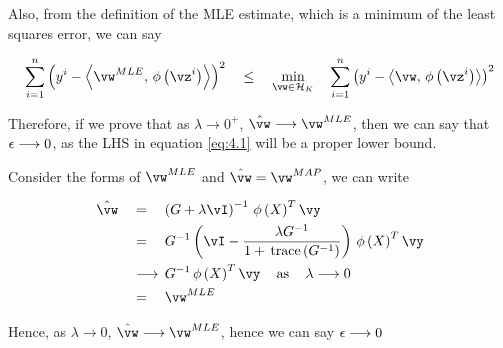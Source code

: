 \documentclass{article}
\begin{document}
\begin{mlsolution}
\begin{addmargin}{1.5em}
		 \br%

		Also, from the definition of the MLE estimate, which is a minimum of the least squares error, we can say

		\begin{align*}
			\sum_{i = 1}^n \para{y^i - \ip{\vw^{MLE}}{\func{\phi}{\vz^i}}}^2	\qle	\min_{\vw \in \Hlb} \quad \sum_{i = 1}^n \para{y^i - \ip{\vw}{\func{\phi}{\vz^i}}}^2
		\end{align*} \br%

		Therefore, if we prove that as $\lambda \longrightarrow 0^+$, $\hat{\vw} \longrightarrow \vw^{MLE}$, then we can say that $\epsilon \longrightarrow 0$, as the LHS in equation \ref{eq:4.1} will be a proper lower bound. \br%


		Consider the forms of $\vw^{MLE}$ and $\hat{\vw} = \vw^{MAP}$, we can write

		\begin{align*}
			\hat{\vw}	&\eq	\para{G + \lambda \iden}^{-1} \func{\phi}{X}^T \vy \\
						&\eq	G^{-1} \para{\iden - \frac{\lambda G^{-1}}{1 + \func{\trace}{G^{-1}}}} \func{\phi}{X}^T \vy \\
						&\quad\longrightarrow\,	G^{-1} \func{\phi}{X}^T \vy \quad \mt{as} \quad \lambda \longrightarrow 0 \\
						&\eq	\vw^{MLE}
		\end{align*}

		Hence, as $\lambda \longrightarrow 0$, $\hat{\vw} \longrightarrow \vw^{MLE}$, hence we can say $\epsilon \longrightarrow 0$

	\end{addmargin}

\end{mlsolution}
\end{document}
